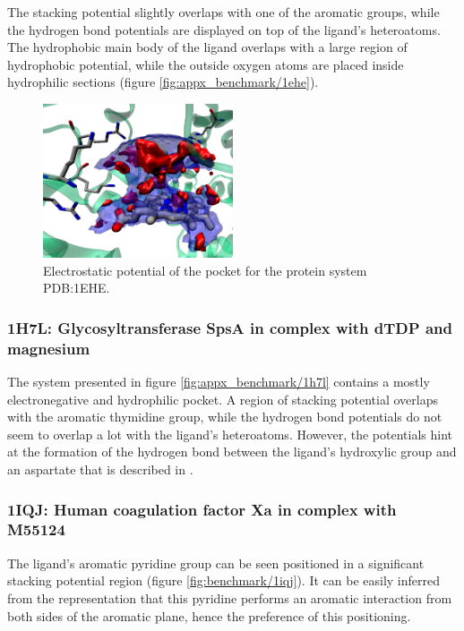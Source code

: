       The stacking potential slightly overlaps with one of the aromatic groups, while the hydrogen bond potentials are displayed on top of the ligand's heteroatoms. The hydrophobic main body of the ligand overlaps with a large region of hydrophobic potential, while the outside oxygen atoms are placed inside hydrophilic sections (figure \ref{fig:appx_benchmark/1ehe}).

      \begin{figure}[H]
        \centering
        \includegraphics[width=0.5\textwidth]{figures/results/benchmark_prot/1ehe.png}
        \caption{\label{fig:benchmark/1ehe} Electrostatic potential of the pocket for the protein system PDB:1EHE.}
      \end{figure}

    \subsubsection{1H7L: Glycosyltransferase SpsA in complex with dTDP and magnesium}
      The system presented in figure \ref{fig:appx_benchmark/1h7l} contains a mostly electronegative and hydrophilic pocket. A region of stacking potential overlaps with the aromatic thymidine group, while the hydrogen bond potentials do not seem to overlap a lot with the ligand's heteroatoms. However, the potentials hint at the formation of the hydrogen bond between the ligand's hydroxylic group and an aspartate that is described in \cite{benchmark_1h7l_2001}.

    \subsubsection{1IQJ: Human coagulation factor Xa in complex with M55124}
      The ligand's aromatic pyridine group can be seen positioned in a significant stacking potential region (figure \ref{fig:benchmark/1iqj}). It can be easily inferred from the representation that this pyridine performs an aromatic interaction from both sides of the aromatic plane, hence the preference of this positioning.

